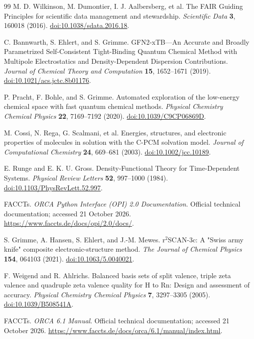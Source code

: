 \begin{thebibliography}{99}
  M. D. Wilkinson, M. Dumontier, I. J. Aalbersberg, et al.
  The FAIR Guiding Principles for scientific data management and stewardship.
  \emph{Scientific Data} \textbf{3}, 160018 (2016).
  \href{https://doi.org/10.1038/sdata.2016.18}{doi:10.1038/sdata.2016.18}.

  C. Bannwarth, S. Ehlert, and S. Grimme.
  GFN2-xTB---An Accurate and Broadly Parametrized Self-Consistent Tight-Binding Quantum Chemical
  Method with Multipole Electrostatics and Density-Dependent Dispersion Contributions.
  \emph{Journal of Chemical Theory and Computation} \textbf{15}, 1652--1671 (2019).
  \href{https://doi.org/10.1021/acs.jctc.8b01176}{doi:10.1021/acs.jctc.8b01176}.

  P. Pracht, F. Bohle, and S. Grimme.
  Automated exploration of the low-energy chemical space with fast quantum chemical methods.
  \emph{Physical Chemistry Chemical Physics} \textbf{22}, 7169--7192 (2020).
  \href{https://doi.org/10.1039/C9CP06869D}{doi:10.1039/C9CP06869D}.

  M. Cossi, N. Rega, G. Scalmani, et al.
  Energies, structures, and electronic properties of molecules in solution with the C-PCM solvation
  model.
  \emph{Journal of Computational Chemistry} \textbf{24}, 669--681 (2003).
  \href{https://doi.org/10.1002/jcc.10189}{doi:10.1002/jcc.10189}.

  E. Runge and E. K. U. Gross.
  Density-Functional Theory for Time-Dependent Systems.
  \emph{Physical Review Letters} \textbf{52}, 997--1000 (1984).
  \href{https://doi.org/10.1103/PhysRevLett.52.997}{doi:10.1103/PhysRevLett.52.997}.

  FACCTs.
  \emph{ORCA Python Interface (OPI) 2.0 Documentation}.
  Official technical documentation; accessed 21 October 2026.
  \url{https://www.faccts.de/docs/opi/2.0/docs/}.

  S. Grimme, A. Hansen, S. Ehlert, and J.-M. Mewes.
  r$^{2}$SCAN-3c: A "Swiss army knife" composite electronic-structure method.
  \emph{The Journal of Chemical Physics} \textbf{154}, 064103 (2021).
  \href{https://doi.org/10.1063/5.0040021}{doi:10.1063/5.0040021}.

  F. Weigend and R. Ahlrichs.
  Balanced basis sets of split valence, triple zeta valence and quadruple zeta valence quality for H
  to Rn: Design and assessment of accuracy.
  \emph{Physical Chemistry Chemical Physics} \textbf{7}, 3297--3305 (2005).
  \href{https://doi.org/10.1039/B508541A}{doi:10.1039/B508541A}.


  FACCTs.
  \emph{ORCA 6.1 Manual}.
  Official technical documentation; accessed 21 October 2026.
  \url{https://www.faccts.de/docs/orca/6.1/manual/index.html}.

\end{thebibliography}
